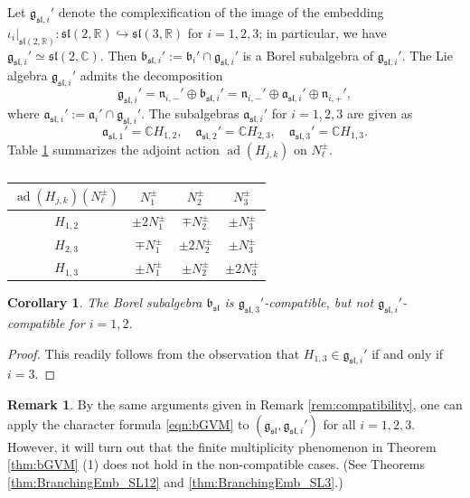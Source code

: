 \documentclass[a4paper,11pt,reqno]{amsart}
\newcommand{\fraka}{\mathfrak{a}}
\newcommand{\frakg}{\mathfrak{g}}
\newcommand{\frakn}{\mathfrak{n}}
\newcommand{\CC}{\mathbb{C}}
\newcommand{\RR}{\mathbb{R}}
\newcommand{\0}{{\bf 0}}
\newcommand{\C}{\mathbb{C}}
\newcommand{\1}{{\bf 1}}
\DeclareMathOperator{\ad}{ad}
\newcommand{\frakb}{{\mathfrak b}}
\newcommand{\fraksl}{{\mathfrak{sl}}}
\theoremstyle{plain}
\newtheorem{corollary}[equation]{Corollary}
\theoremstyle{definition}
\newtheorem{remark}[equation]{Remark}
\numberwithin{equation}{section}
\theoremstyle{definition}
\begin{document}
Let $\frakg_{\fraksl,i}'$ denote the complexification of 
the image of the embedding
$\iota_i \vert_{\mathfrak{sl}(2,\RR)} \colon \mathfrak{sl}(2,\RR) \hookrightarrow 
\mathfrak{sl}(3,\RR)$ for $i=1,2,3$; 
in particular, we have $\frakg_{\fraksl,i}' \simeq \fraksl(2,\CC)$.
Then $\frakb_{\mathfrak{sl},i}':=\frakb_i'\cap \frakg_{\fraksl,i}'$ is a Borel
subalgebra of $\frakg_{\fraksl,i}'$.
The Lie algebra $\frakg_{\fraksl,i}'$ admits the decomposition
\begin{equation*}
\frakg_{\fraksl,i}'
=\frakn_{i,-}' \oplus \frakb_{\fraksl,i}'
= \frakn_{i,-}' \oplus \fraka_{\fraksl,i}' \oplus \frakn_{i,+}',
\end{equation*}
where
$\fraka_{\fraksl,i}' :=\fraka_i' \cap \frakg_{\fraksl,i}'$.
The subalgebras $\fraka_{\fraksl,i}'$ for $i=1,2,3$ are given as
\begin{equation*}
\fraka_{\fraksl,1}' = \C H_{1,2},
\quad
\fraka_{\fraksl,2}' = \C H_{2,3},
\quad
\fraka_{\fraksl,3}' = \C H_{1,3}.
\end{equation*}
Table \ref{table:adH2}  summarizes
the adjoint action $\ad(H_{j,k})$ on $N_\ell^\pm$.
\begin{table}[ht]
\caption{}
\begin{center}
\renewcommand{\arraystretch}{1.3}
{
\begin{tabular}{c|c|c|c}
\hline
$\ad(H_{j,k})(N_\ell^\pm)$ & $N_1^\pm$ & $N_2^\pm$ & $N_3^\pm$\\
\hline
$H_{1,2}$ & $\pm 2N_1^\pm$ & $\mp N_2^\pm$ & $\pm N_3^\pm$\\
\hline
$H_{2,3}$ & $\mp N_1^\pm $ & $\pm 2N_2^\pm$ & $\pm N_3^\pm$\\
\hline
$H_{1,3}$ & $\pm N_1^\pm$ & $\pm N_2^\pm$ & $\pm 2N_3^\pm$\\
\hline
\end{tabular}
}
\end{center}\label{table:adH2}
\end{table}

\begin{corollary}\label{cor:compatibility}
The Borel subalgebra $\frakb_{\mathfrak{sl}}$ is 
$\frakg_{\fraksl,3}'$-compatible, but not 
$\frakg_{\fraksl,i}'$-compatible for $i=1,2$.
\end{corollary}

\begin{proof}
This readily follows from the observation that 
$H_{1,3} \in \frakg_{\fraksl,i}'$ if and only if $i=3$.
\end{proof}

\begin{remark}
By the same arguments given in Remark \ref{rem:compatibility}, 
one can apply the character formula \eqref{eqn:bGVM} 
to $(\frakg_{\fraksl}, \frakg_{\fraksl,i}')$ for all $i=1,2,3$.
However, it will turn out that
the finite multiplicity phenomenon in Theorem \ref{thm:bGVM} (1) does not hold
in the non-compatible cases. 
(See Theorems \ref{thm:BranchingEmb_SL12} and \ref{thm:BranchingEmb_SL3}.)
\end{remark}
\end{document}
